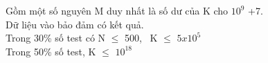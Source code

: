 Gồm một số nguyên M duy nhất là số dư của K cho $10^{9}$ +7.
\\Dữ liệu vào bảo đảm có kết quả.
\\Trong 30\% số test có N  $\le$  500,  K  $\le$  $5x10^{5}$
\\Trong 50\% số test, K  $\le$  $10^{18}$